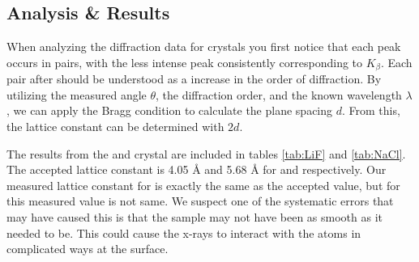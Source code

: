 \documentclass[a4paper,12pt,english]{all-in-one} %
\begin{document}
\begin{multicols}{2}
\section*{Analysis \& Results}
{
When analyzing the diffraction data for crystals you first notice that each peak occurs in pairs, with the less intense peak consistently corresponding to $K_\beta$. Each pair after should be understood as a increase in the order of diffraction. By utilizing the measured angle $\theta$, the diffraction order, and the known wavelength $\lambda$, we can apply the Bragg condition to calculate the plane spacing $d$. From this, the lattice constant can be determined with $2d$.

The results from the  and  crystal are included in tables \ref{tab:LiF} and \ref{tab:NaCl}. The accepted lattice constant is 4.05 {\AA} and 5.68 {\AA} for  and  respectively. Our measured lattice constant for  is exactly the same as the accepted value, but for  this measured value is not same. We suspect one of the systematic errors that may have caused this is that the sample may not have been as smooth as it needed to be. This could cause the x-rays to interact with the atoms in complicated ways at the surface. 

}
\end{multicols}
\end{document}
